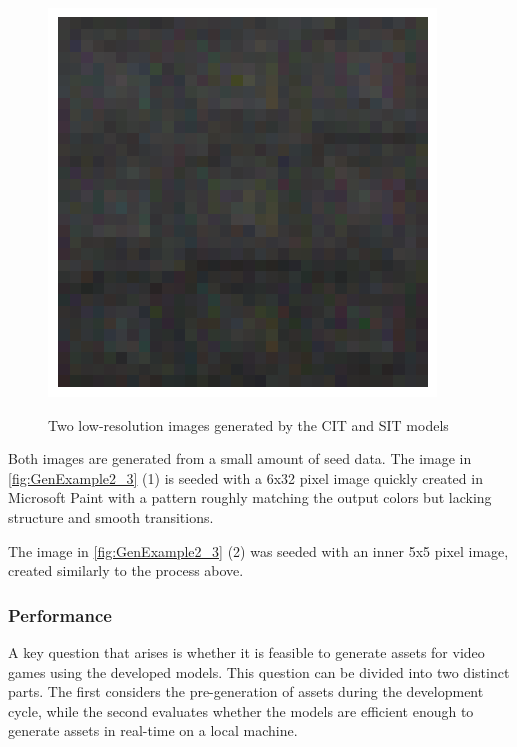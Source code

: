 \begin{itemize}
\begin{figure}[H]
\begin{minipage}{0.30\textwidth}
                    \includegraphics[width=\textwidth]{imgs/GenExample3.png} 
                    \label{fig:GenExample3}
                \end{minipage}
                \caption{Two low-resolution images generated by the CIT and SIT models}
                \label{fig:GenExample2_3}
            \end{figure}
            
            Both images are generated from a small amount of seed data. The image in \autoref{fig:GenExample2_3} (1) is seeded with a 6x32 pixel image quickly created in Microsoft Paint with a pattern roughly matching the output colors but lacking structure and smooth transitions.
    
            The image in \autoref{fig:GenExample2_3} (2) was seeded with an inner 5x5 pixel image, created similarly to the process above.
    \end{itemize}
    
    

\subsubsection{Performance}

    A key question that arises is whether it is feasible to generate assets for video games using the developed models. This question can be divided into two distinct parts. The first considers the pre-generation of assets during the development cycle, while the second evaluates whether the models are efficient enough to generate assets in real-time on a local machine.

